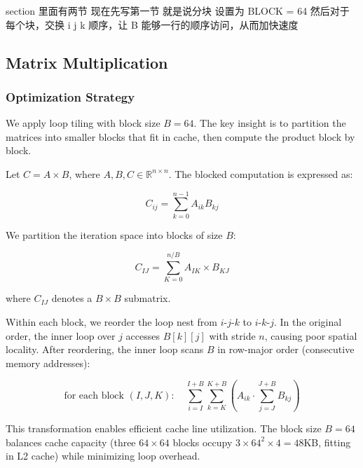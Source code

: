 \documentclass[11pt, a4paper]{article}
\begin{document}
\vspace{1.5em}

\begin{userbox}
section 里面有两节 现在先写第一节 就是说分块 设置为 BLOCK = 64
然后对于每个块，交换 i j k 顺序，让 B 能够一行的顺序访问，从而加快速度

\subsection{Matrix Multiplication}

\subsubsection{Optimization Strategy}

We apply loop tiling with block size $B = 64$. The key insight is to partition the matrices into smaller blocks that fit in cache, then compute the product block by block.

Let $C = A \times B$, where $A, B, C \in \mathbb{R}^{n \times n}$. The blocked computation is expressed as:

\[
C_{ij} = \sum_{k=0}^{n-1} A_{ik} B_{kj}
\]

We partition the iteration space into blocks of size $B$:

\[
C_{IJ} = \sum_{K=0}^{n/B} A_{IK} \times B_{KJ}
\]

where $C_{IJ}$ denotes a $B \times B$ submatrix.

Within each block, we reorder the loop nest from $i$-$j$-$k$ to $i$-$k$-$j$. In the original order, the inner loop over $j$ accesses $B[k][j]$ with stride $n$, causing poor spatial locality. After reordering, the inner loop scans $B$ in row-major order (consecutive memory addresses):

\[
\text{for each block } (I, J, K): \quad
\sum_{i=I}^{I+B} \sum_{k=K}^{K+B} \left( A_{ik} \cdot \sum_{j=J}^{J+B} B_{kj} \right)
\]

This transformation enables efficient cache line utilization. The block size $B = 64$ balances cache capacity (three $64 \times 64$ blocks occupy $3 \times 64^2 \times 4 = 48$KB, fitting in L2 cache) while minimizing loop overhead.
\end{userbox}
\end{document}
